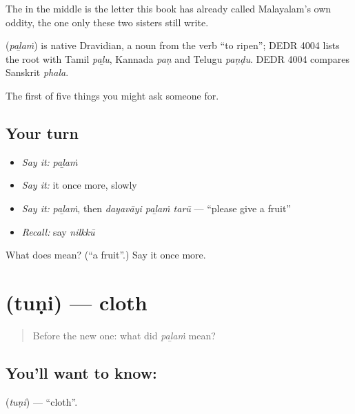 The  in the middle is the letter this book has already called Malayalam's own oddity, the one only these two sisters still write.

\begin{cousinweb}
\textbf{} (\emph{paḻaṁ}) is native Dravidian, a noun from the verb \textquotedblleft{}to ripen\textquotedblright{}; DEDR 4004 lists the root with Tamil \emph{paḻu}, Kannada \emph{paṇ} and Telugu \emph{paṇḍu}. DEDR 4004 compares Sanskrit \emph{phala}.
\end{cousinweb}

\begin{grammarlens}[title={What you've built}]
The first of five things you might ask someone for.
\end{grammarlens}

\subsection*{Your turn}
\begin{itemize}
\raggedright
  \item \emph{Say it:} \emph{paḻaṁ}
  \item \emph{Say it:} it once more, slowly
  \item \emph{Say it:} \emph{paḻaṁ}, then \emph{dayavāyi paḻaṁ tarū} — \textquotedblleft{}please give a fruit\textquotedblright{}
  \item \emph{Recall:} say \emph{nilkkū}
\end{itemize}

\begin{tcolorbox}[breakable,colback=teal!4,colframe=teal!35!black,title={Before you move on}]
What does  mean? (\textquotedblleft{}a fruit\textquotedblright{}.) Say it once more.
\end{tcolorbox}
\section[\texorpdfstring{\ml{തുണി} (tuṇi)}{തുണി (tuṇi)}]{ (tuṇi) — cloth}

\label{lesson:ML-C46-cloth}



\begin{quote}
Before the new one: what did \emph{paḻaṁ} mean?
\end{quote}

\subsection*{You'll want to know: }
\textbf{} (\emph{tuṇi}) — \textquotedblleft{}cloth\textquotedblright{}.

